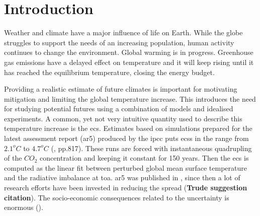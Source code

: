 \chapter{Introduction} \label{ch:introduction}
Weather and climate have a major influence of life on Earth. While the globe struggles to support the needs of an increasing population, human activity continues to change the environment. %
Global warming is in progress. Greenhouse gas emissions have a delayed effect on temperature and it will keep rising until it has reached the equilibrium temperature, closing the energy budget. 


Providing a realistic estimate of future climates is important for motivating mitigation and limiting the global temperature increase. 
This introduces the need for studying potential futures using a combination of models and idealised experiments. A common, yet not very intuitive quantity used to describe this temperature increase is the \acrfull{ecs}. 
Estimates based on %
simulations prepared for the latest assessment report (\acrshort{ar5}) produced by the \acrfull{ipcc} puts \acrshort{ecs}s in the range from $2.1^oC$ to $4.7^oC$ (\cite{IPCC_CH9_climate_models}, pp.817). These runs are forced with instantaneous quadrupling of the $CO_2$ concentration %
and keeping it constant for 150 years. Then the \acrshort{ecs} is computed as the linear fit between perturbed global mean surface temperature and the radiative imbalance at \acrfull{toa}. 
\acrshort{ar5} was published in \citeyear{IPCC_entire_book}, since then a lot of research efforts have been invested in reducing the spread (\textbf{Trude suggestion citation}).
The socio-economic consequences related to the uncertainty is enormous (\cite{bony2015}). 


